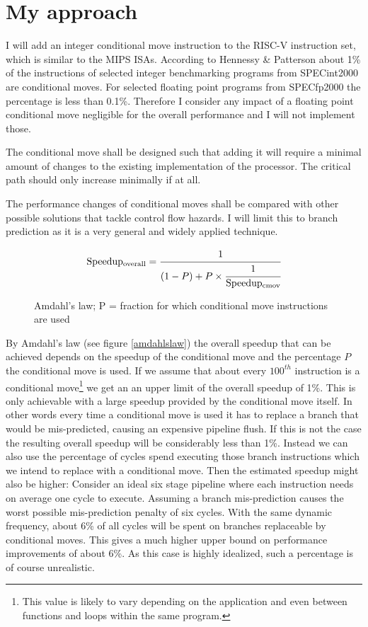 \documentclass[12pt,twoside,notitlepage]{report}
\begin{document}
\section{My approach}

I will add an integer conditional move instruction to the RISC-V instruction set, which is similar to the MIPS \gls{ISA}s. According to Hennessy \& Patterson \cite{HenPat2012} about 1\% of the instructions of selected integer benchmarking programs from SPECint2000 are conditional moves. For selected floating point programs from SPECfp2000 the percentage is less than 0.1\%. Therefore I consider any impact of a floating point conditional move negligible for the overall performance and I will not implement those.

The conditional move shall be designed such that adding it will require a minimal amount of changes to the existing implementation of the processor. The critical path should only increase minimally if at all.

The performance changes of conditional moves shall be compared with other possible solutions that tackle control flow hazards. I will limit this to branch prediction as it is a very general and widely applied technique.

\begin{figure}
\begin{equation*}
\mathrm{Speedup_{overall}}=\cfrac{1}{(1-P)+P \times\cfrac{1}{\mathrm{Speedup_{cmov}}}}
\end{equation*}
\caption{Amdahl's law; P = fraction for which conditional move instructions are used}
\end{figure}

By Amdahl's law (see figure \ref{amdahlslaw}) the overall speedup that can be achieved depends on the speedup of the conditional move and the percentage $P$ the conditional move is used. If we assume that about every $100^{th}$ instruction is a conditional move\footnote{This value is likely to vary depending on the application and even between functions and loops within the same program.} we get an an upper limit of the overall speedup of 1\%. 
This is only achievable with a large speedup provided by the conditional move itself. In other words every time a conditional move is used it has to replace a branch that would be mis-predicted, causing an expensive pipeline flush. If this is not the case the resulting overall speedup will be considerably less than 1\%. Instead we can also use the percentage of cycles spend executing those branch instructions which we intend to replace with a conditional move. Then the estimated speedup might also be higher: Consider an ideal six stage pipeline where each instruction needs on average one cycle to execute. Assuming a branch mis-prediction causes the worst possible mis-prediction penalty of six cycles. With the same dynamic frequency, about 6\% of all cycles will be spent on branches replaceable by conditional moves. This gives a much higher upper bound on performance improvements of about 6\%. As this case is highly idealized, such a percentage is of course unrealistic.
\end{document}
